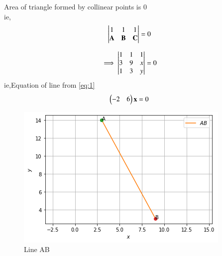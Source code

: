 \documentclass[journal,12pt,twocolumn]{IEEEtran}
\begin{document}
	Area of triangle formed by collinear points is 0\\
	ie,
	\begin{align}
	 \begin{vmatrix}1 & 1& 1 \\
	 \mathbf{A}&\mathbf{B}&\mathbf{C}\end{vmatrix}=0
	\end{align}

	
\begin{align}
\implies\begin{vmatrix}
	 1 & 1 & 1 \\ 
	 3 & 9 & x \\ 
	 1 & 3 & y\end{vmatrix}=0 \label{eq:1}
\end{align}
ie,Equation of line from \eqref{eq:1}
\begin{align}
	    \begin{pmatrix}-2 & 6\end{pmatrix}\mathbf{x}=0
\end{align}
\begin{figure}[!h]
\centering
\includegraphics[width=\columnwidth]{figure5.png}
\caption{Line AB}
\end{figure}
\end{document}
